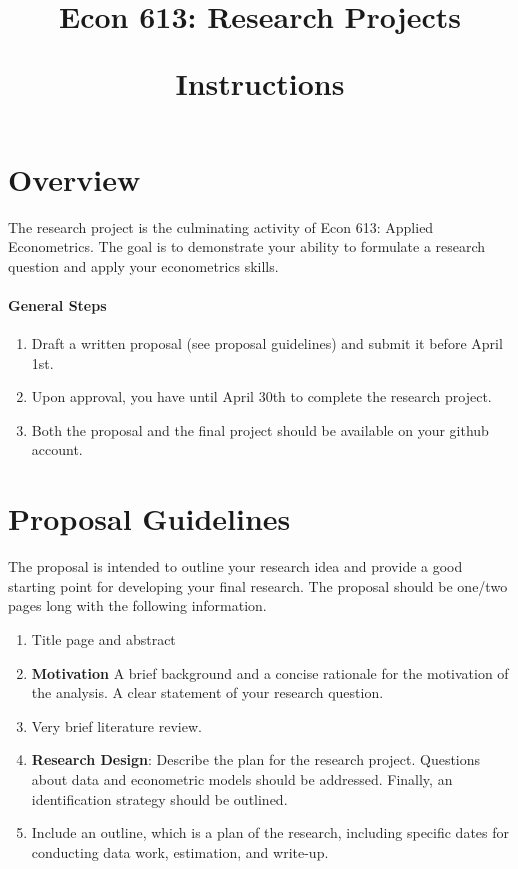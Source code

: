 \documentclass[a4paper,10pt]{article}
\title{
Econ 613: Research Projects \\ 
\begin{large} 
Instructions
\end{large}}
\author{}
\date{}
\begin{document}
\maketitle

\section*{Overview}

The research project is the culminating activity of Econ 613: Applied Econometrics. The goal is to demonstrate your ability to formulate a research question and apply your econometrics skills. 

\paragraph*{General Steps}

\begin{enumerate}
 \item Draft a written proposal (see proposal guidelines) and submit it before April 1st. 
 \item Upon approval, you have until April 30th to complete the research project. 
 \item Both the proposal and the final project should be available on your github account. 
\end{enumerate}

\newpage
\section*{Proposal Guidelines}
The proposal is intended to outline your research idea and provide a good starting point for developing your final research. The proposal should be one/two pages long with the following information.

\begin{enumerate}
\item Title page and abstract 
\item \textbf{Motivation} A brief background and a concise rationale for the motivation of the analysis. A clear statement of your research question.
\item Very brief literature review. 
\item \textbf{Research Design}: Describe the plan for the research project. Questions about data and econometric models should be addressed. Finally, an identification strategy should be outlined.  
\item Include an outline, which is a plan of the research, including specific dates for conducting data work, estimation, and write-up.  
\end{enumerate}
\end{document}
